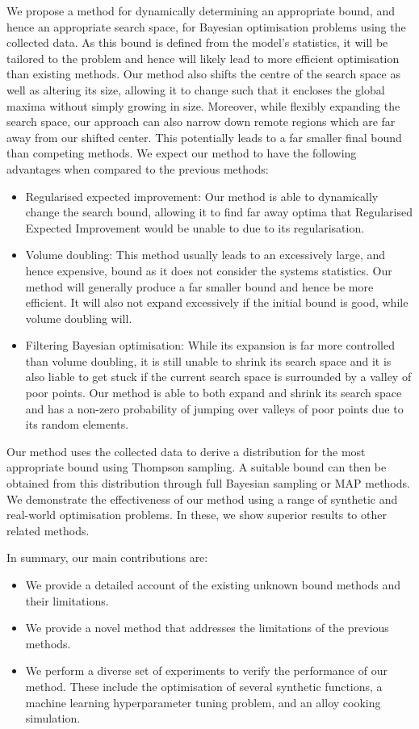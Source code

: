 \documentclass[preprint]{elsarticle}
\begin{document}
We propose a method for dynamically determining an appropriate bound, and hence an appropriate search space, for Bayesian optimisation problems using the collected data. As this bound is defined from the model's statistics, it will be tailored to the problem and hence will likely lead to more efficient optimisation than existing methods. Our method also shifts the centre of the search space as well as altering its size, allowing it to change such that it encloses the global maxima without simply growing in size. Moreover, while flexibly expanding the search space, our approach can also narrow down remote regions which are far away from our shifted center. This potentially leads to a far smaller final bound than competing methods. We expect our method to have the following advantages when compared to the previous methods:
\begin{itemize}
\item Regularised expected improvement: Our method is able to dynamically change the search bound, allowing it to find far away optima that Regularised Expected Improvement would be unable to due to its regularisation. 
\item Volume doubling: This method usually leads to an excessively large, and hence expensive, bound as it does not consider the systems statistics. Our method will generally produce a far smaller bound and hence be more efficient. It will also not expand excessively if the initial bound is good, while volume doubling will.
\item Filtering Bayesian optimisation: While its expansion is far more controlled than volume doubling, it is still unable to shrink its search space and it is also liable to get stuck if the current search space is surrounded by a valley of poor points. Our method is able to both expand and shrink its search space and has a non-zero probability of jumping over valleys of poor points due to its random elements.
\end{itemize}

Our method uses the collected data to derive a distribution for the most appropriate bound using Thompson sampling. A suitable bound can then be obtained from this distribution through full Bayesian sampling or MAP methods. We demonstrate the effectiveness of our method using a range of synthetic and real-world optimisation problems. In these, we show superior results to other related methods.

In summary, our main contributions are:
\begin{itemize}
\item We provide a detailed account of the existing unknown bound methods and their limitations.
\item We provide a novel method that addresses the limitations of the previous methods.
\item We perform a diverse set of experiments to verify the performance of our method. These include the optimisation of several synthetic functions, a machine learning hyperparameter tuning problem, and an alloy cooking simulation. 
\end{itemize}
\end{document}
